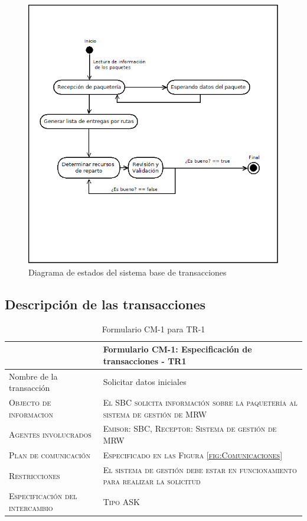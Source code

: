   \begin{figure}[H]
    \centering
    \includegraphics[scale=0.50]{imaxes/Control_Transacciones.png}
    \caption{\label{fig:ControlTransacciones}Diagrama de estados del sistema base de transacciones}
  \end{figure}
  
\subsection{Descripción de las transacciones}

\begin{table}[H]
  \scriptsize
  \begin{tabularx}{\textwidth}{|l|X|} \hline
    & \textbf{Formulario CM-1: Especificación de transacciones - TR1} \\
    \hline\hline
    {Nombre de la transacción} & Solicitar datos iniciales\\
    \hline  
    \textsc{Objecto de informacion} & \textsc{El SBC solicita información sobre la paquetería al sistema de gestión de MRW}\\ 
    \hline
    \textsc{Agentes involucrados} & \textsc{Emisor: SBC, Receptor: Sistema de gestión de MRW}\\ 
    \hline
    \textsc{Plan de comunicación} & \textsc{Especificado en las Figura \ref{fig:Comunicaciones} }\\ 
    \hline
    \textsc{Restricciones} & \textsc{El sistema de gestión debe estar en funcionamiento para realizar la solicitud}\\ 
    \hline
    \textsc{Especificación del intercambio} & \textsc{Tipo ASK}\\ 
    \hline
  \end{tabularx}
  \caption{\label{tab:TR1}Formulario CM-1 para TR-1}
\end{table}
  

